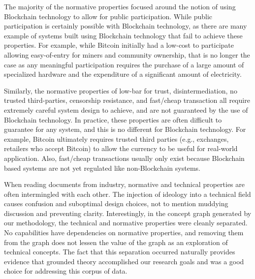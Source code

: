 The majority of the normative properties focused around the notion of using Blockchain technology to allow for public participation.
While public participation is certainly possible with Blockchain technology, as there are many example of systems built using Blockchain technology that fail to achieve these properties.
For example, while Bitcoin initially had a low-cost to participate allowing easy-of-entry for miners and community ownership, that is no longer the case as any meaningful participation requires the purchase of a large amount of specialized hardware and the expenditure of a significant amount of electricity.

Similarly, the normative properties of low-bar for trust, disintermediation, no trusted third-parties, censorship resistance, and fast/cheap transaction all require extremely careful system design to achieve, and are not guaranteed by the use of Blockchain technology.
In practice, these properties are often difficult to guarantee for any system, and this is no different for Blockchain technology.
For example, Bitcoin ultimately requires trusted third parties (e.g., exchanges, retailers who accept Bitcoin) to allow the currency to be useful for real-world application.
Also, fast/cheap transactions usually only exist because Blockchain based systems are not yet regulated like non-Blockchain systems.

When reading documents from industry, normative and technical properties are often intermingled with each other.
The injection of ideology into a technical field causes confusion and suboptimal design choices, not to mention muddying discussion and preventing clarity.
Interestingly, in the concept graph generated by our methodology, the technical and normative properties were cleanly separated.
No capabilities have dependencies on normative properties, and removing them from the graph does not lessen the value of the graph as an exploration of technical concepts.
The fact that this separation occurred naturally provides evidence that grounded theory accomplished our research goals and was a good choice for addressing this corpus of data.


